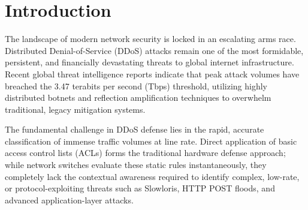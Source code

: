 \documentclass[sigconf, nonacm]{acmart}
\begin{document}
\begin{abstract}
Empirical evaluations utilizing the TRex traffic generator and the CIC-DDoS2019 dataset on a BMv2 software switch demonstrate that P4-XGBoost achieves a remarkable 97.4\% classification accuracy with a median end-to-end mitigation latency of 28 ms. We provide an exhaustive comparative analysis against leading hybrid models (POSEIDON, Jaqen, FlowLens) and all three distinct fully decentralized Gossip protocols, proving our architecture delivers significantly superior detection fidelity without overwhelming the control plane. Finally, we present six ablation studies validating our design parameters, feature dimensionality, and ML hyperparameter tuning, establishing P4-XGBoost as a viable, high-performance defense mechanism for modern terabit-scale networks.
\end{abstract}


\maketitle

\section{Introduction}

The landscape of modern network security is locked in an escalating arms race. Distributed Denial-of-Service (DDoS) attacks remain one of the most formidable, persistent, and financially devastating threats to global internet infrastructure. Recent global threat intelligence reports indicate that peak attack volumes have breached the 3.47 terabits per second (Tbps) threshold, utilizing highly distributed botnets and reflection amplification techniques to overwhelm traditional, legacy mitigation systems. 

The fundamental challenge in DDoS defense lies in the rapid, accurate classification of immense traffic volumes at line rate. Direct application of basic access control lists (ACLs) forms the traditional hardware defense approach; while network switches evaluate these static rules instantaneously, they completely lack the contextual awareness required to identify complex, low-rate, or protocol-exploiting threats such as Slowloris, HTTP POST floods, and advanced application-layer attacks.
\end{document}
